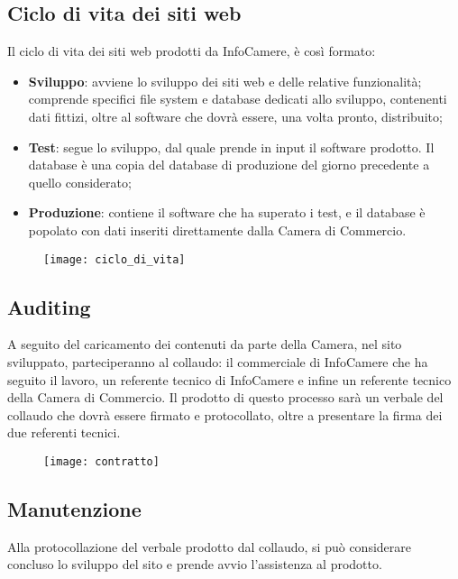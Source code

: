	\subsection{Ciclo di vita dei siti web}
	
	Il ciclo di vita dei siti web prodotti da InfoCamere, è così formato: 
	\begin{itemize}
		\item {\textbf{Sviluppo}: avviene lo sviluppo dei siti web e delle relative funzionalità; comprende specifici file system e database dedicati allo sviluppo, contenenti dati fittizi, oltre al software che dovrà essere, una volta pronto, distribuito;}
		\item {\textbf{Test}: segue lo sviluppo, dal quale prende in input il software prodotto. Il database è una copia del database di produzione del giorno precedente a quello considerato;}
		\item{\textbf{Produzione}: contiene il software che ha superato i test, e il database è popolato con dati inseriti direttamente dalla Camera di Commercio.}
	\end{itemize}

	\begin{figure}[htbp]
		\begin{center}
			\texttt{[image: ciclo\_di\_vita]}
		\end{center}
	\end{figure}
	
	\subsection{Auditing}
	A seguito del caricamento dei contenuti da parte della Camera, nel sito sviluppato, parteciperanno al collaudo: il commerciale di InfoCamere che ha seguito il lavoro, un referente tecnico di InfoCamere e infine un referente tecnico della Camera di Commercio. Il prodotto di questo processo sarà un verbale del collaudo che dovrà essere firmato e protocollato, oltre a presentare la firma dei due referenti tecnici.
	
	\begin{figure}[htbp]
		\begin{center}
			\texttt{[image: contratto]}
		\end{center}
	\end{figure}

	\subsection{Manutenzione}
	Alla protocollazione del verbale prodotto dal collaudo, si può considerare concluso lo sviluppo del sito e prende avvio l'assistenza al prodotto.
